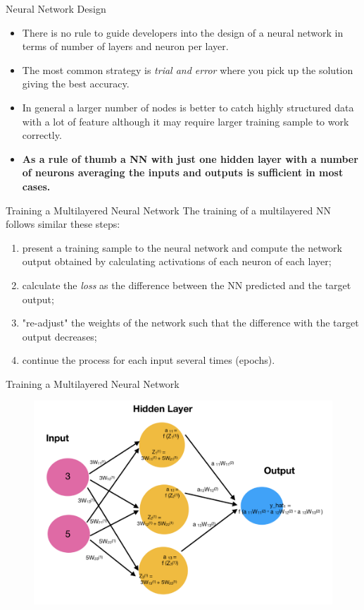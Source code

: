 \documentclass{beamer}
\begin{document}
\begin{frame}{Neural Network Design}
  \begin{itemize}
    \item There is no rule to guide developers into the design of a neural network in terms of number of layers and neuron per layer. 
    \item The most common strategy is \emph{trial and error} where you pick up the solution giving the best accuracy. 
    \item In general a larger number of nodes is better to catch highly structured data with a lot of feature although it may require larger training sample to work correctly.
    \item \textbf{As a rule of thumb a NN with just one hidden layer with a number of neurons averaging the inputs and outputs is sufficient in most cases.}
  \end{itemize}
\end{frame}

\begin{frame}{Training a Multilayered Neural Network}
  The training of a multilayered NN follows similar these steps:
  \begin{enumerate}
    \item present a training sample to the neural network and compute the network output obtained by calculating activations of each neuron of each layer;
    \item calculate the \emph{loss} as the difference between the NN predicted and the target output;
    \item "re-adjust" the weights of the network such that the difference with the target output decreases;
    \item continue the process for each input several times (epochs).
  \end{enumerate}
\end{frame}

\begin{frame}{Training a Multilayered Neural Network}
  \begin{figure}[htb]
    \begin{center}
      \includegraphics[width=0.65\linewidth]{training_nn}
    \end{center}
  \end{figure}
\end{frame}
\end{document}
